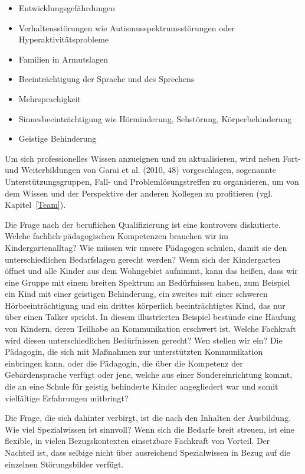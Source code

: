 \begin{itemize}
\item Entwicklungsgefährdungen
\item Verhaltensstörungen wie Autismusspektrumsstörungen oder Hyperaktivitätsprobleme
\item Familien in Armutslagen
\item Beeinträchtigung der Sprache und des Sprechens
\item Mehrsprachigkeit
\item Sinnesbeeinträchtigung wie Hörminderung, Sehstörung, Körperbehinderung
\item Geistige Behinderung
\end{itemize} 

Um sich professionelles Wissen anzueignen und zu aktualisieren, wird neben Fort- und Weiterbildungen von Garai et al. (2010, 48) vorgeschlagen, sogenannte Unterstützungsgruppen, Fall- und Problemlösungstreffen zu organisieren, um von dem Wissen und der Perspektive der anderen Kollegen zu profitieren (vgl. Kapitel~\ref{Team}).

Die Frage nach der beruflichen Qualifizierung ist eine kontrovers diskutierte. Welche fachlich-pädagogischen Kompetenzen brauchen wir im Kindergartenalltag? Wie müssen wir unsere Pädagogen schulen, damit sie den unterschiedlichen Bedarfslagen gerecht werden? Wenn sich der Kindergarten öffnet und alle Kinder aus dem Wohngebiet aufnimmt, kann das heißen, dass wir eine Gruppe mit einem breiten Spektrum an Bedürfnissen haben, zum Beispiel ein Kind mit einer geistigen Behinderung, ein zweites mit einer schweren Hörbeeinträchtigung und ein drittes körperlich beeinträchtigtes Kind, das nur über einen Talker spricht.
In diesem illustrierten Beispiel bestünde eine Häufung von Kindern, deren Teilhabe an Kommunikation erschwert ist. Welche Fachkraft wird diesen unterschiedlichen Bedürfnissen gerecht? Wen stellen wir ein? Die Pädagogin, die sich mit Maßnahmen zur unterstützten Kommunikation einbringen kann, oder die Pädagogin, die über die Kompetenz der Gebärdensprache verfügt oder jene, welche aus einer Sondereinrichtung kommt, die an eine Schule für geistig behinderte Kinder angegliedert war und somit vielfältige Erfahrungen mitbringt? 

Die Frage, die sich dahinter verbirgt, ist die nach den Inhalten der Ausbildung. Wie viel Spezialwissen ist sinnvoll? Wenn sich die Bedarfe breit streuen, ist eine flexible, in vielen Bezugskontexten einsetzbare Fachkraft von Vorteil. Der Nachteil ist, dass selbige nicht über ausreichend Spezialwissen in Bezug auf die einzelnen Störungsbilder verfügt.

